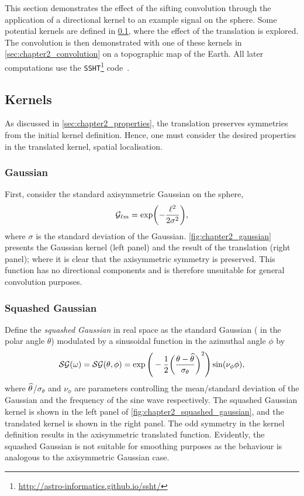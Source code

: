 This section demonstrates the effect of the sifting convolution through the application of a directional kernel to an example signal on the sphere.
Some potential kernels are defined in \cref{sec:chapter2_kernels}, where the effect of the translation is explored.
The convolution is then demonstrated with one of these kernels in \cref{sec:chapter2_convolution} on a topographic map of the Earth.
All later computations use the \texttt{SSHT}\footnote{\url{http://astro-informatics.github.io/ssht/}} code~\autocite{McEwen2011}.

\subsection{Kernels}\label{sec:chapter2_kernels}

As discussed in \cref{sec:chapter2_properties}, the translation preserves symmetries from the initial kernel definition.
Hence, one must consider the desired properties in the translated kernel, \eg{} spatial localisation.

\subsubsection{Gaussian}

First, consider the standard axisymmetric Gaussian on the sphere, \ie{}
%
\begin{equation}
	{\mathcal{G}}_{\ell m}
	= \exp(-\frac{{\ell}^{2}}{2\sigma^{2}}),
\end{equation}
%
where \(\sigma{}\) is the standard deviation of the Gaussian.
\cref{fig:chapter2_gaussian} presents the Gaussian kernel (left panel) and the result of the translation (right panel); where it is clear that the axisymmetric symmetry is preserved.
This function has no directional components and is therefore unsuitable for general convolution purposes.



\subsubsection{Squashed Gaussian}

Define the \emph{squashed Gaussian} in real space as the standard Gaussian (\ie{} in the polar angle \(\theta{}\)) modulated by a sinusoidal function in the azimuthal angle \(\phi{}\) by
%
\begin{equation}
	\mathcal{SG}(\omega)
	= \mathcal{SG}(\theta,\phi)
	= \exp\Bigg(-\frac{1}{2}{\bigg(\frac{\theta-\widehat{\theta}}{\sigma_{\theta}}\bigg)}^{2}\Bigg)
	\sin(\nu_{\phi}\phi),
\end{equation}
%
where \(\widehat{\theta}\)/\(\sigma_{\theta}\) and \(\nu_{\phi}\) are parameters controlling the mean/standard deviation of the Gaussian and the frequency of the sine wave respectively.
The squashed Gaussian kernel is shown in the left panel of \cref{fig:chapter2_squashed_gaussian}, and the translated kernel is shown in the right panel.
The odd symmetry in the kernel definition results in the axisymmetric translated function.
Evidently, the squashed Gaussian is not suitable for smoothing purposes as the behaviour is analogous to the axisymmetric Gaussian case.

